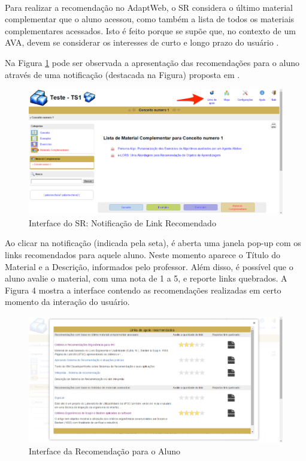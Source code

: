 Para realizar a recomendação no AdaptWeb\textsuperscript{\textregistered}, o SR considera o último material complementar
que o aluno acessou, como também a lista de todos os materiais complementares acessados. Isto é feito porque se supõe
que, no contexto de um AVA, devem se considerar os interesses de curto e longo prazo do usuário \cite{xiang2010temporal}.

Na Figura \ref{fig:adaptweb-notificacao-recomendacao} pode ser observada a apresentação das recomendações para o aluno
através de uma notificação (destacada na Figura) proposta em .

\begin{figure}[htb]
  \caption{\label{fig:adaptweb-notificacao-recomendacao}Interface do SR: Notificação de Link Recomendado}
  \begin{center}
      \includegraphics[scale=1.0]{./Figuras/adaptweb-notificacao-recomendacao.png}
  \end{center}
\end{figure}

Ao clicar na notificação (indicada pela seta), é aberta uma janela pop-up com os links recomendados para aquele aluno.
Neste momento aparece o Título do Material e a Descrição, informados pelo professor. Além disso, é possível que o aluno
avalie o material, com uma nota de 1 a 5, e reporte links quebrados. A Figura 4 mostra a interface contendo as
recomendações realizadas em certo momento da interação do usuário.

\begin{figure}[htb]
  \caption{\label{fig:adaptweb-itens-recomendacao}Interface da Recomendação para o Aluno}
  \begin{center}
      \includegraphics[scale=1.0]{./Figuras/adaptweb-itens-recomendacao.png}
  \end{center}
\end{figure}

